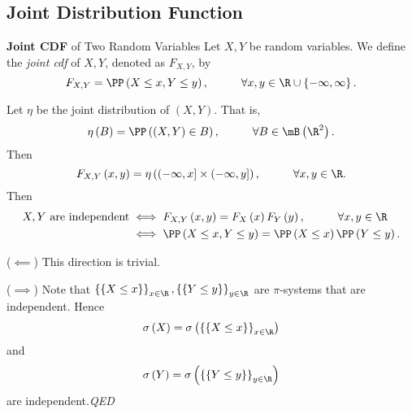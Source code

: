 \documentclass[stat901]{subfiles}
\begin{document}
    \subsection{Joint Distribution Function}

    \begin{definition}{\textbf{Joint CDF} of Two Random Variables}
        Let $X,Y$ be random variables. We define the \emph{joint cdf} of $X,Y$, denoted as $F_{X,Y}$, by
        \begin{equation*}
            F_{X,Y} = \PP\left( X\leq x, Y\leq y \right), \hspace{1cm}\forall x,y\in\R\cup\left\lbrace -\infty,\infty \right\rbrace.
        \end{equation*}
    \end{definition}

    \np Let $\eta$ be the joint distribution of $\left( X,Y \right)$. That is,
    \begin{equation*}
        \eta\left( B \right) = \PP\left( \left( X,Y \right)\in B \right), \hspace{1cm}\forall B\in\mB\left( \R^{2} \right).
    \end{equation*}
    Then
    \begin{equation*}
        F_{X,Y}\left( x,y \right) = \eta\left( \left( -\infty,x \right]\times\left( -\infty,y \right] \right), \hspace{1cm}\forall x,y\in\R.
    \end{equation*}
    Then
    \begin{equation*}
        \begin{aligned}
            \text{$X,Y$ are independent} & \iff F_{X,Y}\left( x,y \right) = F_X\left( x \right)F_Y\left( y \right),\hspace{1cm}\forall x,y\in\R \\
                                         & \iff \PP\left( X\leq x, Y\leq y \right) = \PP\left( X\leq x \right)\PP\left( Y\leq y \right).
        \end{aligned} 
    \end{equation*}
    
    \begin{subproof}
        ($\impliedby$) This direction is trivial.

        ($\implies$) Note that $\left\lbrace \left\lbrace X\leq x \right\rbrace \right\rbrace^{}_{x\in\R}, \left\lbrace \left\lbrace Y\leq y \right\rbrace \right\rbrace^{}_{y\in\R}$ are $\pi$-systems that are independent. Hence
        \begin{equation*}
            \sigma\left( X \right) = \sigma\left( \left\lbrace \left\lbrace X\leq x \right\rbrace \right\rbrace_{x\in\R} \right)
        \end{equation*}
        and
        \begin{equation*}
            \sigma\left( Y \right) = \sigma\left( \left\lbrace \left\lbrace Y\leq y \right\rbrace \right\rbrace_{y\in\R} \right)
        \end{equation*}
        are independent.\hfill\textit{QED}
    \end{subproof}
\end{document}
